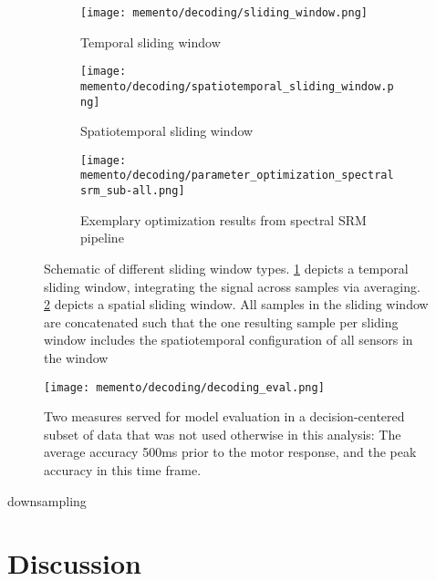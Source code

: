\begin{figure}
	\centering
	\begin{subfigure}{.65\textwidth}
		\texttt{[image: memento/decoding/sliding\_window.png]}
		\caption{Temporal sliding window}
		\label{fig:temporal-slider}
	\end{subfigure}
	\newline
	\begin{subfigure}{0.39\textwidth}
		\texttt{[image: memento/decoding/spatiotemporal\_sliding\_window.png]}
		\caption{Spatiotemporal sliding window}
		\label{fig:spatiotemporal-slider}
	\end{subfigure}
	\begin{subfigure}{0.59\textwidth}
	\texttt{[image: memento/decoding/parameter\_optimization\_spectralsrm\_sub-all.png]}
	\caption{Exemplary optimization results from spectral SRM pipeline}
	\label{fig:decoding-opti-results}
\end{subfigure}
	\caption[Schematic of different sliding window types]{Schematic of different sliding window types. \ref{fig:temporal-slider} depicts a temporal sliding window, integrating the signal across samples via averaging. \ref{fig:spatiotemporal-slider} depicts a spatial sliding window. All samples in the sliding window are concatenated such that the one resulting sample per sliding window includes the spatiotemporal configuration of all sensors in the window}
	\label{fig:sliding-windows}
\end{figure}

\begin{figure}
	\centering
	\texttt{[image: memento/decoding/decoding\_eval.png]}
	\caption[Decoding evaluation]{Two measures served for model evaluation in a decision-centered subset of data that was not used otherwise in this analysis: The average accuracy 500ms prior to the motor response, and the peak accuracy in this time frame.}
	\label{fig:opti-eval}
\end{figure}





downsampling




\pagebreak



\section{Discussion}


